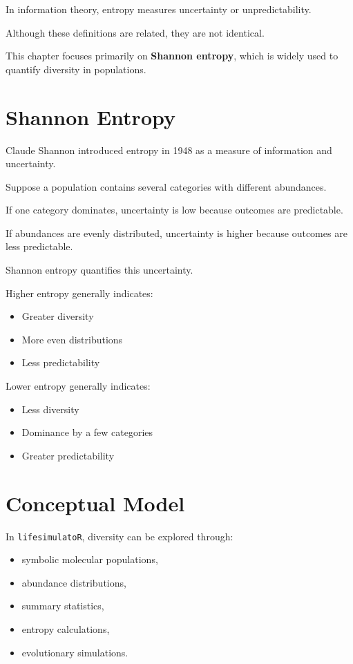 \documentclass[
  oneside,
  openany]{book}
\providecommand{\tightlist}{%
  \setlength{\itemsep}{0pt}\setlength{\parskip}{0pt}}
\begin{document}
In information theory, entropy measures uncertainty or unpredictability.

Although these definitions are related, they are not identical.

This chapter focuses primarily on \textbf{Shannon entropy}, which is widely used to quantify diversity in populations.

\section{Shannon Entropy}\label{shannon-entropy}

Claude Shannon introduced entropy in 1948 as a measure of information and uncertainty.

Suppose a population contains several categories with different abundances.

If one category dominates, uncertainty is low because outcomes are predictable.

If abundances are evenly distributed, uncertainty is higher because outcomes are less predictable.

Shannon entropy quantifies this uncertainty.

Higher entropy generally indicates:

\begin{itemize}
\tightlist
\item
  Greater diversity
\item
  More even distributions
\item
  Less predictability
\end{itemize}

Lower entropy generally indicates:

\begin{itemize}
\tightlist
\item
  Less diversity
\item
  Dominance by a few categories
\item
  Greater predictability
\end{itemize}

\section{Conceptual Model}\label{conceptual-model-2}

In \texttt{lifesimulatoR}, diversity can be explored through:

\begin{itemize}
\tightlist
\item
  symbolic molecular populations,
\item
  abundance distributions,
\item
  summary statistics,
\item
  entropy calculations,
\item
  evolutionary simulations.
\end{itemize}
\end{document}
